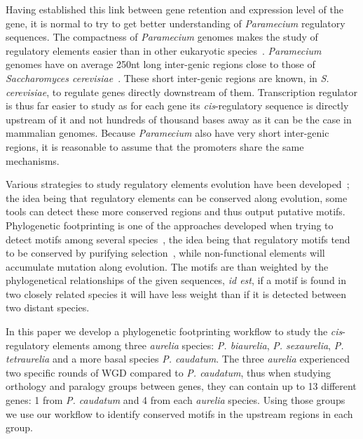 Having established this link between gene retention and expression level of the gene, it is normal to try to get better understanding of \textit{Paramecium} regulatory sequences. The compactness of \textit{Paramecium} genomes makes the study of regulatory elements easier than in other eukaryotic species~\citep{mcgrath_insights_2014}. \textit{Paramecium} genomes have on average 250nt long inter-genic regions close to those of \textit{Saccharomyces cerevisiae}~\citep{chen_minimal_2011}. These short inter-genic regions are known, in \textit{S. cerevisiae}, to regulate genes directly downstream of them. Transcription regulator is thus far easier to study as for each gene its \textit{cis}-regulatory sequence is directly upstream of it and not hundreds of thousand bases away as it can be the case in mammalian genomes. Because \textit{Paramecium} also have very short inter-genic regions, it is reasonable to assume that the promoters share the same mechanisms.

Various strategies to study regulatory elements evolution have been developed~\citep{wittkopp_cis-regulatory_2012}; the idea being that regulatory elements can be conserved along evolution, some tools can detect these more conserved regions and thus output putative motifs. Phylogenetic footprinting is one of the approaches developed when trying to detect motifs among several species~\citep{zhang_mice_2003}, the idea being that regulatory motifs tend to be conserved by purifying selection~\citep{nelson_conserved_2013}, while non-functional elements will accumulate mutation along evolution. The motifs are than weighted by the phylogenetical relationships of the given sequences, \textit{id est}, if a motif is found in two closely related species it will have less weight than if it is detected between two distant species.

In this paper we develop a phylogenetic footprinting workflow to study the \textit{cis}-regulatory elements among three \textit{aurelia} species: \textit{P. biaurelia}, \textit{P. sexaurelia}, \textit{P. tetraurelia} and a more basal species \textit{P. caudatum}. The three \textit{aurelia} experienced two specific rounds of WGD compared to \textit{P. caudatum}, thus when studying orthology and paralogy groups between genes, they can contain up to 13 different genes: 1 from \textit{P. caudatum} and 4 from each \textit{aurelia} species. Using those groups we use our workflow to identify conserved motifs in the upstream regions in each group.

